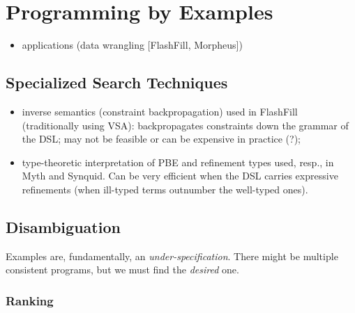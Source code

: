\section{Programming by Examples}
\label{sec:pbe}

\begin{itemize}
\item applications (data wrangling [FlashFill, Morpheus])
\end{itemize}

\subsection{Specialized Search Techniques}
\label{sec:pbe-search-techniques}



\begin{itemize}
\item inverse semantics (constraint backpropagation) used in FlashFill
(traditionally using \ac{VSA}): backpropagates constraints down the grammar of
the \ac{DSL}; may not be feasible or can be expensive in practice (?);
\item type-theoretic interpretation of \ac{PBE} and refinement types used, resp.,
in Myth and Synquid. Can be very efficient when the \ac{DSL} carries expressive
refinements (when ill-typed terms outnumber the well-typed ones).
\end{itemize}

\subsection{Disambiguation}
\label{sec:resolving-ambiguity}

Examples are, fundamentally, an \textit{under-specification}. There might be
multiple consistent programs, but we must find the \textit{desired} one.

\subsubsection{Ranking}

